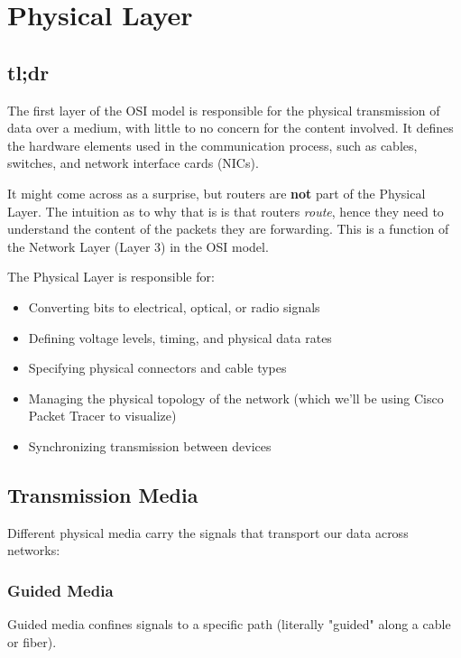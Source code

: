 \chapter{Physical Layer}\label{sec:osi_physical}
\section{tl;dr}
The first layer of the OSI model is responsible for the physical transmission of data over a medium, with little to no concern for the content involved. It defines the hardware elements used in the communication process, such as cables, switches, and network interface cards (NICs).

\begin{noteblock}
    It might come across as a surprise, but routers are \textbf{not} part of the Physical Layer. The intuition as to why that is is that routers \textit{route}, hence they need to understand the content of the packets they are forwarding. This is a function of the Network Layer (Layer 3) in the OSI model.
\end{noteblock}

The Physical Layer is responsible for:
\begin{itemize}
    \item Converting bits to electrical, optical, or radio signals
    \item Defining voltage levels, timing, and physical data rates
    \item Specifying physical connectors and cable types
    \item Managing the physical topology of the network (which we'll be using Cisco Packet Tracer to visualize)
    \item Synchronizing transmission between devices
\end{itemize}

\newpage

\section{Transmission Media}
Different physical media carry the signals that transport our data across networks:

\subsection*{Guided Media}
Guided media confines signals to a specific path (literally "guided" along a cable or fiber). 

